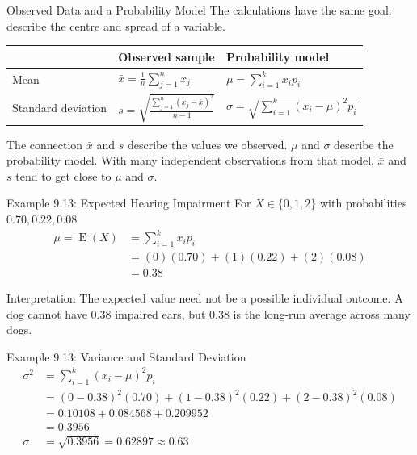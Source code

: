 \documentclass[aspectratio=169]{beamer}
\newcommand{\E}{\operatorname{E}}
\begin{document}
\begin{frame}{Observed Data and a Probability Model}
The calculations have the same goal: describe the centre and spread of a variable.

\begin{table}
\centering
\small
\begin{tabular}{lll}
\toprule
& \textbf{Observed sample} & \textbf{Probability model}\\
\midrule
Mean
& $\displaystyle\bar{x}=\frac{1}{n}\sum_{j=1}^{n}x_j$
& $\displaystyle\mu=\sum_{i=1}^{k}x_i p_i$\\[0.35cm]
Standard deviation
& $\displaystyle s=\sqrt{\frac{\sum_{j=1}^{n}(x_j-\bar{x})^2}{n-1}}$
& $\displaystyle\sigma=\sqrt{\sum_{i=1}^{k}(x_i-\mu)^2p_i}$\\
\bottomrule
\end{tabular}
\end{table}

\begin{block}{The connection}
$\bar{x}$ and $s$ describe the values we observed. $\mu$ and $\sigma$ describe the probability model. With many independent observations from that model, $\bar{x}$ and $s$ tend to get close to $\mu$ and $\sigma$.
\end{block}
\end{frame}

\begin{frame}{Example 9.13: Expected Hearing Impairment}
For $X\in\{0,1,2\}$ with probabilities $0.70,0.22,0.08$
\begin{align*}
\mu =\E(X) &=\sum_{i=1}^{k}x_i p_i\\
&=(0)(0.70)+(1)(0.22)+(2)(0.08)\\
&=\boxed{0.38}
\end{align*}

\begin{alertblock}{Interpretation}
The expected value need not be a possible individual outcome. A dog cannot have $0.38$ impaired ears, but $0.38$ is the long-run average across many dogs.
\end{alertblock}
\end{frame}

\begin{frame}{Example 9.13: Variance and Standard Deviation}
\small
\begin{align*}
\sigma^2 &=\sum_{i=1}^{k}(x_i-\mu)^2p_i \\
&=(0-0.38)^2(0.70)+(1-0.38)^2(0.22)+(2-0.38)^2(0.08)\\
&=0.10108+0.084568+0.209952\\
&=\boxed{0.3956}\\[0.2cm]
\sigma&=\sqrt{0.3956}=\boxed{0.62897}\approx 0.63
\end{align*}
\end{frame}
\end{document}
